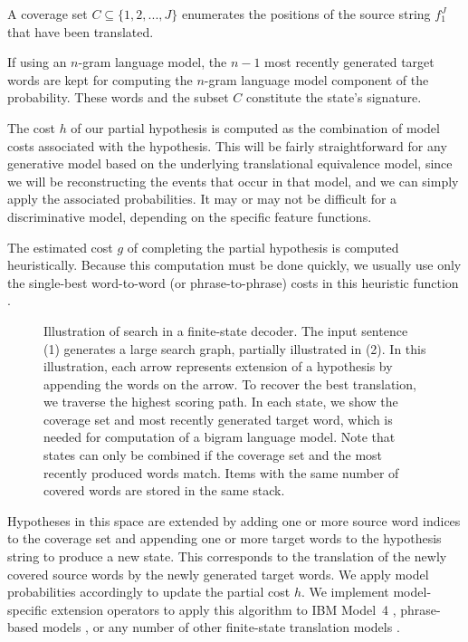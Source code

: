 \begin{asparaenum}
\item A coverage set $C \subseteq \{1,2,...,J\}$
enumerates the positions of the source
string $f_1^J$ that have been translated.
\item If using an $n$-gram language model,
the $n-1$ most recently generated target words 
are kept for computing the $n$-gram
language model component of the probability.
These words and the subset $C$ constitute the
state's signature.
\item The cost $h$ of our partial hypothesis is computed as
the combination of model costs associated with the hypothesis.
This will be fairly straightforward for any generative 
model based on the underlying translational equivalence
model, since we will be reconstructing the events that 
occur in that model, and we can simply apply the 
associated probabilities.  It may or may not be difficult
for a discriminative model, depending on the specific
feature functions.
\item The estimated cost $g$ of completing the partial hypothesis
is computed heuristically.  Because this computation must be
done quickly, we usually use only the single-best
word-to-word (or phrase-to-phrase) costs in this 
heuristic function \citep{Koehn:2004:amta}.
\end{asparaenum}

\figpreamble
\begin{figure*}[t]
\figfontsize{\begin{center}

\end{center}}
\figpostamble
\caption[Illustration of search in a finite-state decoder]{Illustration of search in a finite-state decoder.  The input
sentence (1) generates a large search graph, partially illustrated
in (2).  In this illustration, each arrow represents extension of a
hypothesis by appending the words on the arrow.  To recover the best 
translation, we traverse the highest scoring path.  In each state, we
show the coverage set and most recently generated target word,
which is needed for computation of a bigram language model.  
Note that states can only be combined if
the coverage set and the most recently produced words match.  Items with
the same number of covered words are stored in the same stack.}
\label{fig:fst-search}
\end{figure*}

Hypotheses in this space are extended 
by adding one or more source word indices to the coverage set
and appending one or more target words to the 
hypothesis string to produce a new state.  This corresponds
to the translation of the newly covered source words by
the newly generated target words.  We apply model
probabilities accordingly to update the partial cost $h$.
We implement model-specific extension
operators to apply this algorithm to IBM Model~4 
\citep{Tillman:2003:cl,Germann:2004:ai},
phrase-based models \citep{Koehn:2004:amta}, or any number of other
finite-state translation models 
\citep{Wang:1997:acl,Niessen:1998:acl}.  

